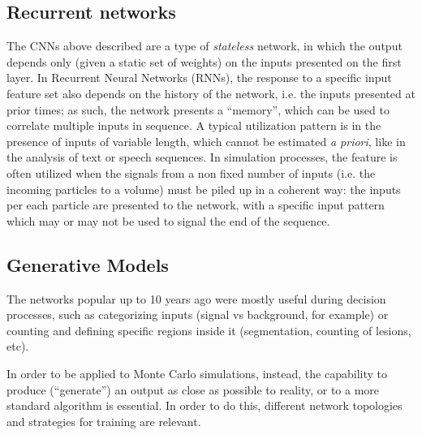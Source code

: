 \subsection{Recurrent networks}
The CNNs above described are a type of \emph{stateless} network, in which the output depends only (given a static set of weights) on the inputs presented on the first layer. In Recurrent Neural Networks (RNNs), the response to a specific input feature set also depends on the history of the network, i.e. the inputs presented at prior times; as such, the network presents a ``memory'', which can be used to correlate multiple inputs in sequence. A typical utilization pattern is in the presence of inputs of variable length, which cannot be estimated \emph{a priori}, like in the analysis of text or speech sequences. 
In simulation processes, the feature is often utilized when the signals from a non fixed number of inputs (i.e. the incoming particles to a volume) must be piled up in a coherent way: the inputs per each particle are presented to the network, with a specific input pattern which may or may not be used to signal the end of the sequence. %

\subsection{Generative Models}
\label{subseq:gan}
The networks popular up to 10 years ago were mostly useful during decision processes, such as categorizing inputs (signal vs background, for example) or counting and defining specific regions inside it (segmentation, counting of lesions, etc).

In order to be applied to Monte Carlo simulations, instead, the capability to produce (``generate'') an output as close as possible to reality, or to a more standard algorithm is essential. In order to do this, different network topologies and strategies for training are relevant.


